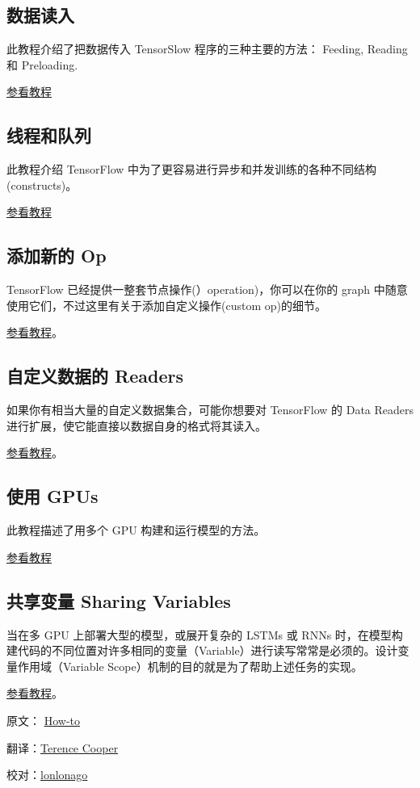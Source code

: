 \subsection{数据读入}\label{ux6570ux636eux8bfbux5165}

此教程介绍了把数据传入 TensorSlow 程序的三种主要的方法： Feeding,
Reading 和 Preloading.

\href{../how_tos/reading_data.md}{参看教程}

\subsection{线程和队列}\label{ux7ebfux7a0bux548cux961fux5217}

此教程介绍 TensorFlow
中为了更容易进行异步和并发训练的各种不同结构(constructs)。

\href{../how_tos/threading_and_queues.md}{参看教程}

\subsection{添加新的 Op}\label{ux6dfbux52a0ux65b0ux7684-op}

TensorFlow 已经提供一整套节点操作(）operation)，你可以在你的 graph
中随意使用它们，不过这里有关于添加自定义操作(custom op)的细节。

\href{../how_tos/adding_an_op.md}{参看教程}。

\subsection{自定义数据的
Readers}\label{ux81eaux5b9aux4e49ux6570ux636eux7684-readers}

如果你有相当大量的自定义数据集合，可能你想要对 TensorFlow 的 Data
Readers 进行扩展，使它能直接以数据自身的格式将其读入。

\href{../how_tos/new_data_formats.md}{参看教程}。

\subsection{使用 GPUs}\label{ux4f7fux7528-gpus}

此教程描述了用多个 GPU 构建和运行模型的方法。

\href{../how_tos/using_gpu.md}{参看教程}

\subsection{共享变量 Sharing
Variables}\label{ux5171ux4eabux53d8ux91cf-sharing-variables}

当在多 GPU 上部署大型的模型，或展开复杂的 LSTMs 或 RNNs
时，在模型构建代码的不同位置对许多相同的变量（Variable）进行读写常常是必须的。设计变量作用域（Variable
Scope）机制的目的就是为了帮助上述任务的实现。

\href{../how_tos/variable_scope/index.md}{参看教程}。

原文： \href{http://tensorflow.org/how_tos/index.html}{How-to}

翻译：\href{https://github.com/TerenceCooper}{Terence Cooper}

校对：\href{https://github.com/lonlonago}{lonlonago}